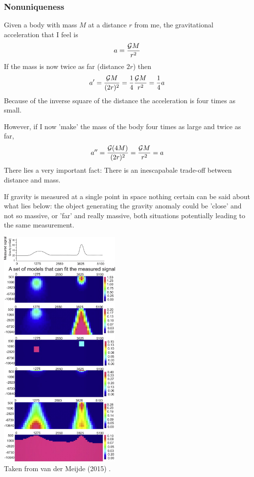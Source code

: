 \subsubsection{Nonuniqueness}

Given a body with mass $M$ at a distance $r$ from me, the gravitational acceleration 
that I feel is 
\[
a = \frac{{\cal G} M}{r^2}
\]
If the mass is now twice as far (distance $2r$) then 
\[
a' = \frac{{\cal G} M}{(2r)^2} =  \frac{1}{4} \frac{{\cal G} M}{r^2} = \frac{1}{4}a
\]
Because of the inverse square of the distance the acceleration is four times as small. 

However, if I now 'make' the mass of the body four times as large and twice as far, 
\[
a'' = \frac{{\cal G} (4M)}{(2r)^2} = \frac{{\cal G} M}{r^2} =a
\]
There lies a very important fact: There is an inescapabale trade-off between distance 
and mass. 

If gravity is measured at a single point in space nothing certain can be said about 
what lies below: the object generating the gravity anomaly could be 'close' and 
not so massive, or 'far' and really massive, 
both situations potentially leading to the same measurement.

\begin{center}
\includegraphics[width=6cm]{images/gravity/nonunique}\\
{\captionfont Taken from van der Meijde \etal (2015) \cite{vapb15}.}
\end{center}


